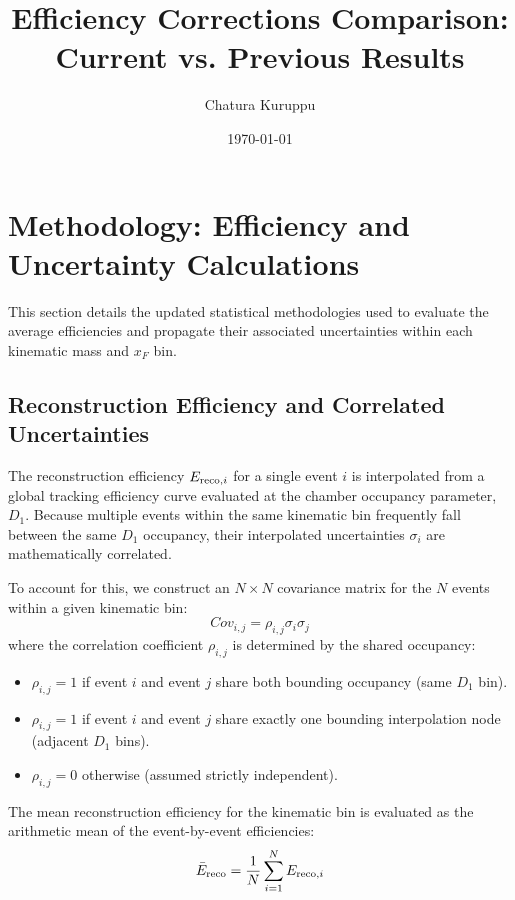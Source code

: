 \documentclass[12pt, a4paper]{article}
\title{Efficiency Corrections Comparison: Current vs. Previous Results}
\author{Chatura Kuruppu}
\date{\today}
\begin{document}
\maketitle

\tableofcontents
\clearpage

\listoffigures
\clearpage

\section{Methodology: Efficiency and Uncertainty Calculations}

This section details the updated statistical methodologies used to evaluate the average efficiencies and propagate their associated uncertainties within each kinematic mass and $x_F$ bin.

\subsection{Reconstruction Efficiency and Correlated Uncertainties}
The reconstruction efficiency $E_{{\rm reco}, i}$ for a single event $i$ is interpolated from a global tracking efficiency curve evaluated at the chamber occupancy parameter, $D_1$. Because multiple events within the same kinematic bin frequently fall between the same $D_1$ occupancy, their interpolated uncertainties $\sigma_i$ are mathematically correlated.

To account for this, we construct an $N \times N$ covariance matrix for the $N$ events within a given kinematic bin:
\begin{equation}
    Cov_{i,j} = \rho_{i,j} \sigma_i \sigma_j
\end{equation}
where the correlation coefficient $\rho_{i,j}$ is determined by the shared occupancy:
\begin{itemize}
    \item $\rho_{i,j} = 1$ if event $i$ and event $j$ share both bounding occupancy (same $D_1$ bin).
    \item $\rho_{i,j} = 1$ if event $i$ and event $j$ share exactly one bounding interpolation node (adjacent $D_1$ bins).
    \item $\rho_{i,j} = 0$ otherwise (assumed strictly independent).
\end{itemize}

The mean reconstruction efficiency for the kinematic bin is evaluated as the arithmetic mean of the event-by-event efficiencies:
\begin{equation}
    \bar{E}_{\rm reco} = \frac{1}{N} \sum_{i=1}^{N} E_{{\rm reco}, i}
\end{equation}
\end{document}
